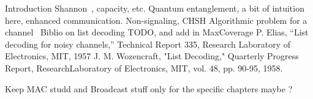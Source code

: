 Introduction Shannon~\cite{Shannon48}, capacity, etc.
Quantum entanglement, a bit of intuition here, enhanced communication.
Non-signaling, CHSH
Algorithmic problem for a channel~\cite{BF18}
Biblio on list decoding TODO, and add in MaxCoverage
P. Elias, “List decoding for noisy channels,” Technical Report 335,
Research Laboratory of Electronics, MIT, 1957
J. M. Wozencraft, "List Decoding," Quarterly Progress Report, ResearchLaboratory of Electronics, MIT, vol. 48, pp. 90-95, 1958.

Keep MAC studd and Broadcast stuff only for the specific chapters maybe ?
